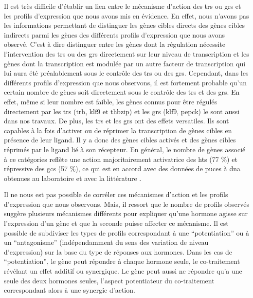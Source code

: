 \documentclass[../main.tex]{subfiles}
\begin{document}
	Il est très difficile d'établir un lien entre le mécanisme d'action des \glspl{tr} ou \glspl{gr} et les profils d'expression que nous avons mis en évidence.
	En effet, nous n'avons pas les informations permettant de distinguer les gènes cibles directs des gènes cibles indirects parmi les gènes des différents profils d'expression que nous avons observé.
	C'est à dire distinguer entre les gènes dont la régulation nécessite l'intervention des \glspl{tr} ou des \glspl{gr} directement sur leur niveau de transcription et les gènes dont la transcription est modulée par un autre facteur de transcription qui lui aura été préalablement sous le contrôle des \glspl{tr} ou des \glspl{gr}.
	Cependant, dans les différents profils d'expression que nous observons, il est fortement probable qu'un certain nombre de gènes soit directement sous le contrôle des \glspl{tr} et des \glspl{gr}.
	En effet, même si leur nombre est faible, les gènes connus pour être régulés directement par les \glspl{tr} (\gls{trb}, \gls{klf9} et \gls{thbzip}) et les \glspl{gr} (\gls{klf9}, \gls{pepck}) le sont aussi dans nos travaux.
	De plus, les \glspl{tr} et les \glspl{gr} ont des effets versatiles.
	Ils sont capables à la fois d'activer ou de réprimer la transcription de gènes cibles en présence de leur ligand.
	Il y a donc des gènes cibles activés et des gènes cibles réprimés par le ligand lié à son récepteur.
	En général, le nombre de gènes associé à ce catégories reflète une action majoritairement activatrice des \glspl{ht} (77 \%) et répressive des \glspl{gc} (57 \%), ce qui est en accord avec des données de puces à \gls{dna} obtenues au laboratoire et avec la littérature \citep{Das2006}.
	\par
	Il ne nous est pas possible de corréler ces mécanismes d'action et les profils d'expression que nous observons.
	Mais, il ressort que le nombre de profils observés suggère plusieurs mécanismes différents pour expliquer qu'une hormone agisse sur l'expression d'un gène et que la seconde puisse affecter ce mécanisme.
	Il est possible de subdiviser les types de profils correspondant à une ``potentiation'' ou à un ``antagonisme'' (indépendamment du sens des variation de niveau d'expression) sur la base du type de réponses aux hormones.
	Dans les cas de ``potentiation'', le gène peut répondre à chaque hormone seule, le co-traitement révélant un effet additif ou synergique.
	Le gène peut aussi ne répondre qu'a une seule des deux hormones seules, l'aspect potentiateur du co-traitement correspondant alors à une synergie d'action.
	\par
\end{document}
